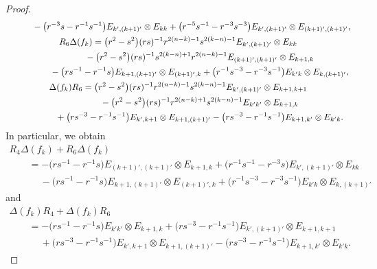 \documentclass[pdftex]{sigma}
\numberwithin{equation}{section}
\begin{document}
\begin{proof}
\begin{gather*}
 \quad\qquad{} - \bigl(r^{-3}s - r^{-1}s^{-1} \bigr)E_{k',(k + 1)'} \otimes E_{kk} + \bigl(r^{-5}s^{-1} - r^{-3}s^{-3} \bigr)E_{k',(k + 1)'} \otimes E_{(k + 1)',(k + 1)'},
\\[0.2mm]
 R_{6}\Delta(f_{k}) = \bigl(r^{2} - s^{2} \bigr)(rs)^{-1}r^{2(n - k) - 1}s^{2(k - n) -1}E_{k',(k + 1)'} \otimes E_{kk} \\[0.2mm]
 \hphantom{R_{6}\Delta(f_{k}) =}{}
 - \bigl(r^{2} -s^{2} \bigr)(rs)^{-1}s^{2(k - n) + 1}r^{2(n - k) - 1}E_{(k + 1)',(k + 1)'} \otimes E_{k + 1,k} \\[0.2mm]
 \hphantom{R_{6}\Delta(f_{k}) = }{}
 - \bigl(rs^{-1} - r^{-1}s \bigr)E_{k + 1,(k + 1)'} \otimes E_{(k + 1)',k} + \bigl(r^{-1}s^{-3} - r^{-3}s^{-1} \bigr)E_{k'k} \otimes E_{k,(k + 1)'},
 \\[0.2mm]
 \Delta(f_{k})R_{6} = \bigl(r^{2} - s^{2} \bigr)(rs)^{-1}r^{2(n - k) - 1}s^{2(k - n) - 1}E_{k',(k + 1)'} \otimes E_{k + 1,k + 1} \\[0.2mm]
 \hphantom{\Delta(f_{k})R_{6} =}{}
 - \bigl(r^{2} - s^{2} \bigr)(rs)^{-1}r^{2(n - k) + 1}s^{2(k - n) - 1}E_{k'k'} \otimes E_{k + 1,k} \\[0.2mm]
 \hphantom{\Delta(f_{k})R_{6} =}{}
 + \bigl(rs^{-3} - r^{-1}s^{-1} \bigr)E_{k',k + 1} \otimes E_{k + 1,(k + 1)'} - \bigl(rs^{-3} - r^{-1}s^{-1} \bigr)E_{k + 1,k'} \otimes E_{k'k}.
\end{gather*}
In particular, we obtain
\begin{gather*}
 R_{4}\Delta(f_{k}) + R_{6}\Delta(f_{k}) \\
 \qquad{}= -\bigl(rs^{-1} - r^{-1}s\bigr)E_{(k + 1)',(k + 1)'} \otimes E_{k + 1,k} + \bigl(r^{-1}s^{-1} - r^{-3}s\bigr)E_{k',(k + 1)'} \otimes E_{kk} \\
 \qquad\quad\ {}{-} \bigl(rs^{-1} - r^{-1}s\bigr)E_{k + 1,(k + 1)'} \otimes E_{(k + 1)',k} + \bigl(r^{-1}s^{-3} - r^{-3}s^{-1}\bigr)E_{k'k} \otimes E_{k, (k + 1)'}
\end{gather*}
and
\begin{gather*}
 \Delta(f_{k})R_{4} + \Delta(f_{k})R_{6} \\
 \qquad{}=-\bigl(rs^{-1} - r^{-1}s\bigr)E_{k'k'} \otimes E_{k + 1,k} + \bigl(rs^{-3} - r^{-1}s^{-1}\bigr)E_{k',(k + 1)'} \otimes E_{k + 1,k + 1} \\
 \quad\qquad\ {} {+}\bigl(rs^{-3} - r^{-1}s^{-1}\bigr)E_{k',k + 1} \otimes E_{k + 1,(k + 1)'} - \bigl(rs^{-3} - r^{-1}s^{-1}\bigr)E_{k + 1,k'} \otimes E_{k'k}.
\end{gather*}


\end{proof}
\end{document}
